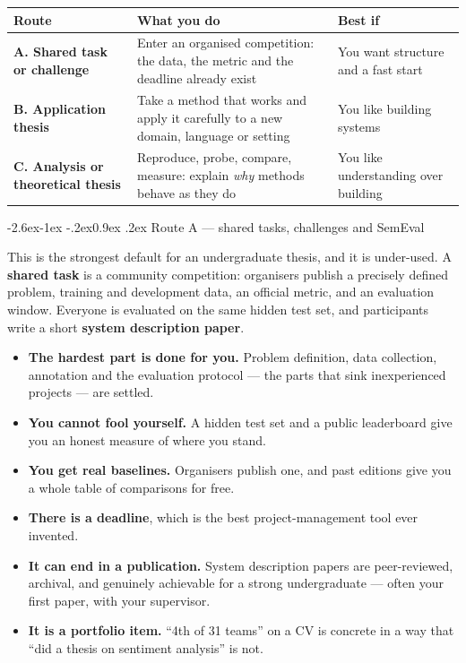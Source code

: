 \documentclass[11pt,a4paper]{article}
\makeatletter
\renewcommand\subsection{\@startsection{subsection}{2}{\z@}%
  {-2.6ex\@plus -1ex \@minus -.2ex}{0.9ex \@plus .2ex}%
  {\normalfont\large\bfseries\color{brandlight}}}
\newenvironment{cbox}[1]
 {\par\addvspace{\medskipamount}%
  \setlength{\FrameSep}{7pt}%
  \def\FrameCommand{{\color{brandlight}\vrule width 2.2pt}\hspace{9pt}}%
  \MakeFramed{\advance\hsize-\width \FrameRestore}%
  \small\parindent=0pt\noindent{\bfseries\color{brand}#1}\par\nobreak\smallskip
  \normalcolor\ignorespaces}
 {\par\endMakeFramed\addvspace{\medskipamount}}
\newcommand{\thead}[1]{\textbf{\color{brand}#1}}
\makeatother
\begin{document}
\begin{center}
\small
\begin{tabularx}{\textwidth}{L{3.0cm} X L{3.6cm}}
\toprule
\thead{Route} & \thead{What you do} & \thead{Best if} \\
\midrule
{}
\textbf{A. Shared task or challenge} & Enter an organised competition: the
data, the metric and the deadline already exist & You want structure and a
fast start \\
\textbf{B. Application thesis} & Take a method that works and apply it
carefully to a new domain, language or setting & You like building systems \\
\textbf{C. Analysis or theoretical thesis} & Reproduce, probe, compare,
measure: explain \emph{why} methods behave as they do & You like understanding
over building \\
\bottomrule
\end{tabularx}
\end{center}

\subsection{Route A --- shared tasks, challenges and SemEval}
\label{sec:sharedtasks}

This is the strongest default for an undergraduate thesis, and it is
under-used. A \textbf{shared task} is a community competition: organisers
publish a precisely defined problem, training and development data, an official
metric, and an evaluation window. Everyone is evaluated on the same hidden test
set, and participants write a short \textbf{system description paper}.

\begin{cbox}{Why this is such a good fit}
\begin{itemize}
  \item \textbf{The hardest part is done for you.} Problem definition, data
        collection, annotation and the evaluation protocol --- the parts that
        sink inexperienced projects --- are settled.
  \item \textbf{You cannot fool yourself.} A hidden test set and a public
        leaderboard give you an honest measure of where you stand.
  \item \textbf{You get real baselines.} Organisers publish one, and past
        editions give you a whole table of comparisons for free.
  \item \textbf{There is a deadline}, which is the best project-management tool
        ever invented.
  \item \textbf{It can end in a publication.} System description papers are
        peer-reviewed, archival, and genuinely achievable for a strong
        undergraduate --- often your first paper, with your supervisor.
  \item \textbf{It is a portfolio item.} ``4th of 31 teams'' on a CV is
        concrete in a way that ``did a thesis on sentiment analysis'' is not.
\end{itemize}
\end{cbox}
\end{document}
